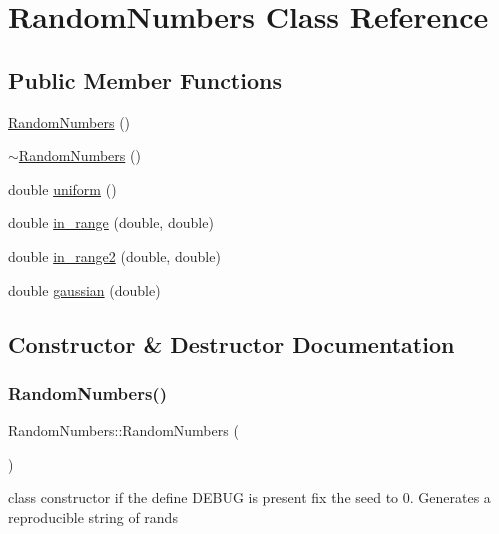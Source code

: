 \hypertarget{class_random_numbers}{}\section{Random\+Numbers Class Reference}
\label{class_random_numbers}
\subsection*{Public Member Functions}
\begin{DoxyCompactItemize}
\item 
\mbox{\hyperlink{class_random_numbers_a4fc77d1cb0734a65f806b5d0ca40eafc}{Random\+Numbers}} ()
\item 
\mbox{\hyperlink{class_random_numbers_a29b02e7197c0c93eecb22b81c615889b}{$\sim$\+Random\+Numbers}} ()
\item 
double \mbox{\hyperlink{class_random_numbers_a50c452e744fa83cdc4ee7f5b03e99df4}{uniform}} ()
\item 
double \mbox{\hyperlink{class_random_numbers_a3a982a5e1cc0b981d829dd64ce1ee787}{in\+\_\+range}} (double, double)
\item 
double \mbox{\hyperlink{class_random_numbers_afb570fabac6a6f9e4fb9530d8bfd0b9d}{in\+\_\+range2}} (double, double)
\item 
double \mbox{\hyperlink{class_random_numbers_a98ae0cc416acc48bee0d33cd6cc79190}{gaussian}} (double)
\end{DoxyCompactItemize}


\subsection{Constructor \& Destructor Documentation}
\mbox{\label{class_random_numbers_a4fc77d1cb0734a65f806b5d0ca40eafc}} 
\subsubsection{\texorpdfstring{RandomNumbers()}{RandomNumbers()}}
{\footnotesize\ttfamily Random\+Numbers\+::\+Random\+Numbers (\begin{DoxyParamCaption}{ }\end{DoxyParamCaption})}

class constructor if the define D\+E\+B\+UG is present fix the seed to 0. Generates a reproducible string of rands

